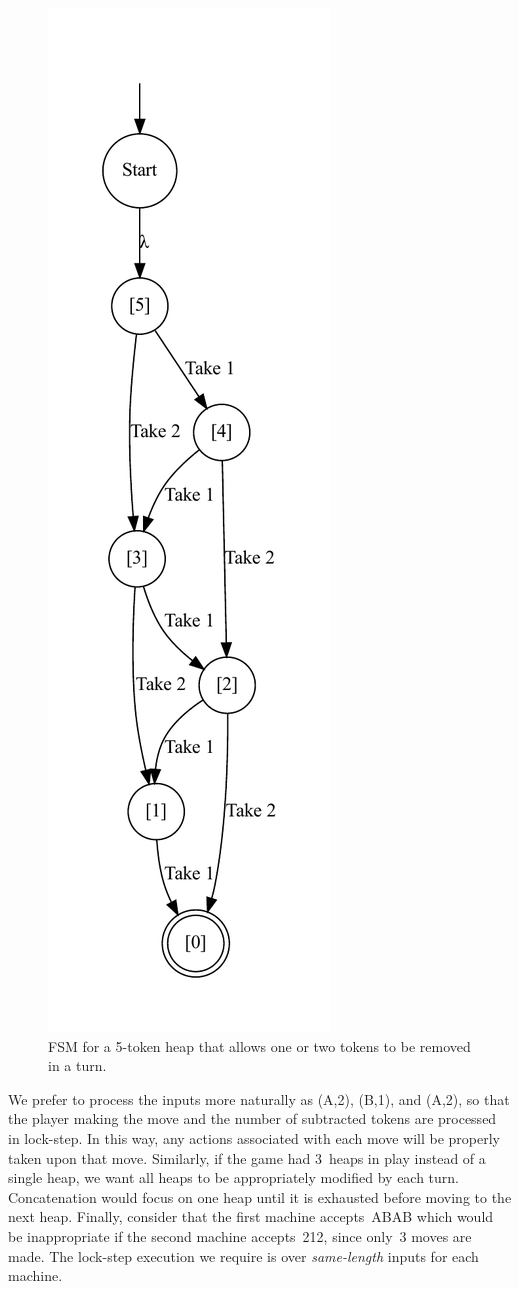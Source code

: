 \documentclass[conference]{IEEEtran}
\begin{document}
\begin{figure}
    \centering
    \includegraphics[width=0.3\linewidth]{figures/nimexample/heapFSM.pdf}
    \caption{FSM for a 5-token heap that allows one or two tokens to be removed in a turn.}
    \label{fig:nimHeapFSM} 
\end{figure}

We prefer to process the inputs more naturally as (A,2), (B,1), and (A,2), so that the player making the move and the number of subtracted tokens are processed in lock-step.  In this way, any actions associated with each move will be properly taken upon that move.  Similarly, if the game had 3~heaps in play instead of a single heap, we want all heaps to be appropriately modified by each turn.  Concatenation would focus on one heap until it is exhausted before moving to the next heap.   Finally, consider that the first machine accepts~ABAB which would be inappropriate if the second machine accepts~212, since only~3 moves are made.  The lock-step execution we require is over \emph{same-length} inputs for each machine.
\end{document}
